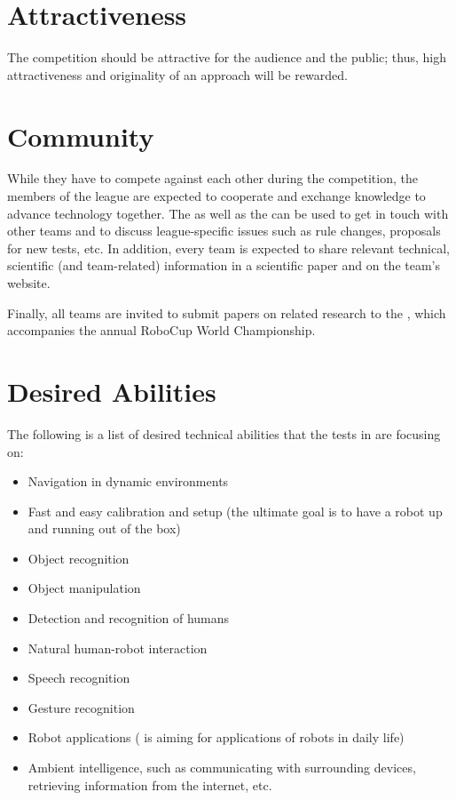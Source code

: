 \section{Attractiveness}
\label{concept:attractiveness}

The competition should be attractive for the audience and the public; thus, high attractiveness and originality of an approach will be rewarded.

\section{Community}
\label{concept:community}

While they have to compete against each other during the competition, the members of the \AtHome{} league are expected to cooperate and exchange knowledge to advance technology together.
The  as well as the \RR{} can be used to get in touch with other teams and to discuss league-specific issues such as rule changes, proposals for new tests, etc.
In addition, every team is expected to share relevant technical, scientific (and team-related) information in a scientific paper and on the team's website.

Finally, all teams are invited to submit papers on related research to the \Symp{}, which accompanies the annual RoboCup World Championship.

\section{Desired Abilities}
\label{concept:desired_abilities}

The following is a list of desired technical abilities that the tests in \AtHome{} are focusing on:

\begin{itemize}
    \item Navigation in dynamic environments
    \item Fast and easy calibration and setup (the ultimate goal is to have a robot up and running out of the box)
    \item Object recognition
    \item Object manipulation
    \item Detection and recognition of humans
    \item Natural human-robot interaction
    \item Speech recognition
    \item Gesture recognition
    \item Robot applications (\AtHome{} is aiming for applications of robots in daily life)
    \item Ambient intelligence, such as communicating with surrounding devices, retrieving information from the internet, etc.
\end{itemize}


